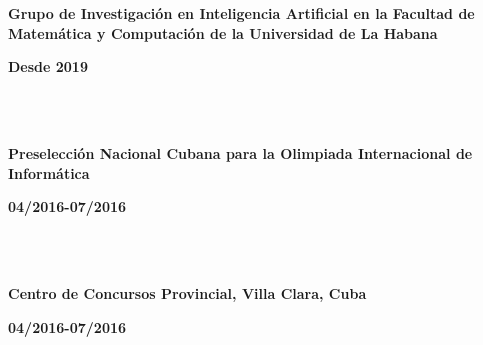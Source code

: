 \documentclass{article}
\begin{document}
\begin{minipage}{0.8\textwidth}
\parbox{0.8\linewidth}{\textbf{Grupo de Investigación en Inteligencia Artificial en la Facultad de Matemática y Computación de la Universidad de La Habana}} \hfill \textbf{Desde 2019}\\
\\
\end{minipage}\\
\begin{minipage}{0.8\textwidth}
\parbox{0.8\linewidth}{\textbf{Preselección Nacional Cubana para la Olimpiada Internacional de Informática}} \hfill \textbf{04/2016-07/2016}\\
\\
\end{minipage}\\
\begin{minipage}{0.8\textwidth}
\parbox{0.8\linewidth}{\textbf{Centro de Concursos Provincial, Villa Clara, Cuba}} \hfill \textbf{04/2016-07/2016}\\
\\
\end{minipage}\\

\newpage
\end{document}
